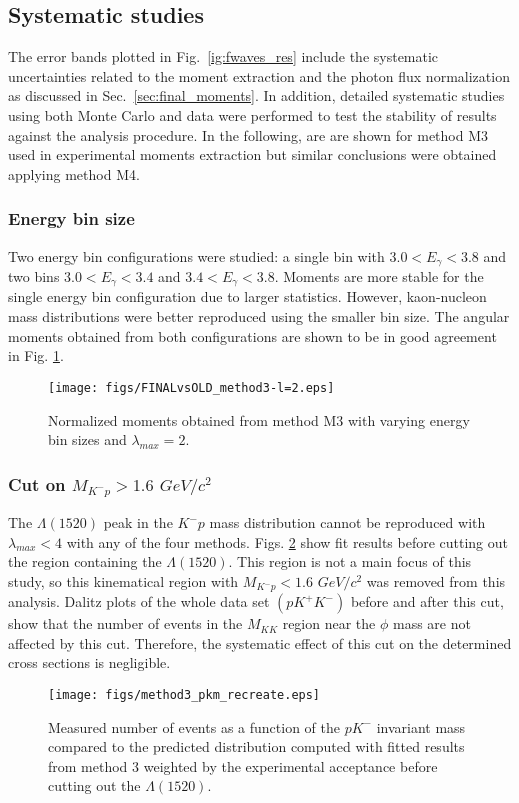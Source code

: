 \documentclass[twocolumn,superscriptaddress,prd]{revtex4}
\begin{document}
\subsection{Systematic studies}\label{sec:sys}
The error bands plotted in  Fig.~\ref{ig:fwaves_res} include
the systematic uncertainties related to the moment extraction  and the photon flux normalization
as discussed in  Sec.~\ref{sec:final_moments}. In addition, detailed systematic studies using both Monte Carlo and data were performed to test the stability of results against the analysis procedure.
In the following, are are shown for method M3 used in experimental moments extraction but similar conclusions were obtained applying method M4.

\subsubsection{Energy bin size}
Two energy bin configurations were studied: a single bin with $3.0 < E_{\gamma} < 3.8$ and two bins $3.0 < E_{\gamma} < 3.4$ and $3.4 < E_{\gamma} < 3.8$. Moments are more stable for the single energy bin configuration due to larger statistics. However, kaon-nucleon mass distributions were better reproduced using the smaller bin size. The angular moments obtained from both configurations are shown to be in good agreement in Fig. \ref{fig:ebin1}.
\begin{figure}
\texttt{[image: figs/FINALvsOLD\_method3-l=2.eps]}
\caption{Normalized moments obtained from method M3 with varying energy bin sizes and $\lambda_{max}=2$.}
\label{fig:ebin1}
\end{figure}
\subsubsection{Cut on $M_{K^-p} > 1.6$ $GeV/c^2$}
The $\Lambda(1520)$ peak in the $K^-p$ mass distribution cannot be reproduced with $\lambda_{max} < 4$ with any of the four methods. Figs. \ref{fig:before_cut1} show fit results before cutting out the region containing the $\Lambda(1520)$.
This region is not a main focus of this study, so this kinematical region with $M_{K^-p} < 1.6$ $GeV/c^2$ was removed from this analysis. Dalitz plots of the whole data set $(p K^+ K^-)$ before and after this cut, show that the number of events in the $M_{KK}$ region near the $\phi$ mass are not affected by this cut. Therefore, the systematic effect of this cut on the determined cross sections is negligible. \begin{figure}[htpb]
\texttt{[image: figs/method3\_pkm\_recreate.eps]}
\caption{Measured number of events as a function of the $pK^-$ invariant mass compared to the predicted distribution computed with fitted results from method 3 weighted by the experimental acceptance before cutting out the $\Lambda(1520)$.}
\label{fig:before_cut1}
\end{figure}
\end{document}
